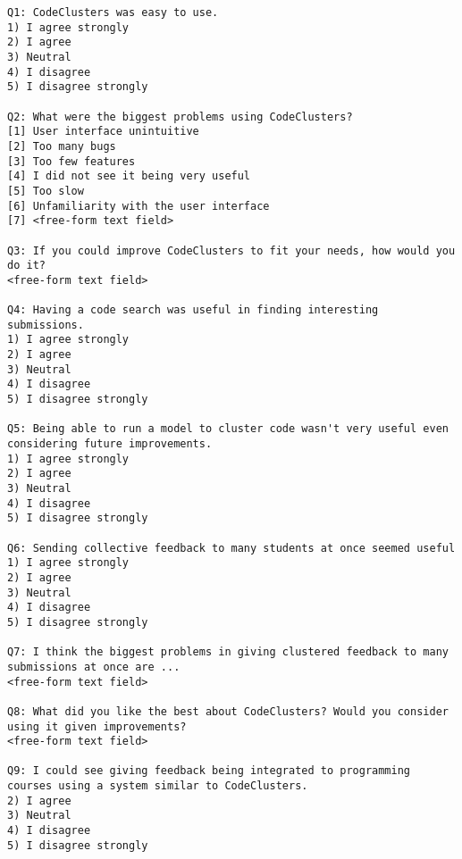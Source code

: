 \begin{lstlisting}
Q1: CodeClusters was easy to use.
1) I agree strongly
2) I agree
3) Neutral
4) I disagree
5) I disagree strongly

Q2: What were the biggest problems using CodeClusters?
[1] User interface unintuitive
[2] Too many bugs
[3] Too few features
[4] I did not see it being very useful
[5] Too slow
[6] Unfamiliarity with the user interface
[7] <free-form text field>

Q3: If you could improve CodeClusters to fit your needs, how would you do it?
<free-form text field>

Q4: Having a code search was useful in finding interesting submissions.
1) I agree strongly
2) I agree
3) Neutral
4) I disagree
5) I disagree strongly

Q5: Being able to run a model to cluster code wasn't very useful even considering future improvements.
1) I agree strongly
2) I agree
3) Neutral
4) I disagree
5) I disagree strongly

Q6: Sending collective feedback to many students at once seemed useful
1) I agree strongly
2) I agree
3) Neutral
4) I disagree
5) I disagree strongly

Q7: I think the biggest problems in giving clustered feedback to many submissions at once are ...
<free-form text field>

Q8: What did you like the best about CodeClusters? Would you consider using it given improvements?
<free-form text field>

Q9: I could see giving feedback being integrated to programming courses using a system similar to CodeClusters.
2) I agree
3) Neutral
4) I disagree
5) I disagree strongly

\end{lstlisting}